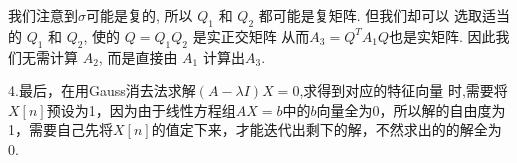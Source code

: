 我们注意到$\sigma$可能是复的, 所以 $Q_1$ 和 $Q_2$ 都可能是复矩阵. 但我们却可以
选取适当的 $Q_1$ 和 $Q_2$, 使的 $Q=Q_1Q_2$ 是实正交矩阵
从而$A_3 = Q^T A_1Q $也是实矩阵. 因此我们无需计算 $A_2$, 而是直接由 $A_1$ 计算出$A_3$.

4.最后，在用Gauss消去法求解$(A-\lambda I)X=0$,求得到对应的特征向量
时,需要将$X[n]$预设为1，因为由于线性方程组$AX=b$中的$b$向量全为0，所以解的自由度为1，需要自己先将$X[n]$的值定下来，才能迭代出剩下的解，不然求出的的解全为0.

